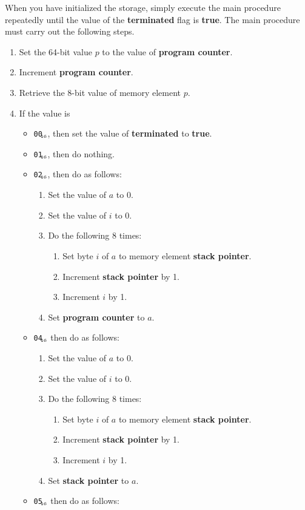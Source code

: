 \documentclass[a4paper,11pt]{article}
\newcommand{\PC}{\textbf{program counter}\xspace}
\newcommand{\SP}{\textbf{stack pointer}\xspace}
\newcommand{\TERM}{\textbf{terminated}\xspace}
\newcommand{\T}{\textbf{true}\xspace}
\newcommand{\num}[1]{\texttt{#1}\xspace}
\newcommand{\hex}[1]{\num{#1}$_{\textup{\tiny\hskip-1ex 16}}$\xspace}
\newcommand{\op}[1]{#1}
\newcommand{\EXIT}     [1]{\op{\hex{00}}\xspace}
\newcommand{\NOP}      [1]{\op{\hex{01}}\xspace}
\newcommand{\JUMP}     [1]{\op{\hex{02}}\xspace}
\newcommand{\SETSP}    [1]{\op{\hex{04}}\xspace}
\newcommand{\GETPC}    [1]{\op{\hex{05}}\xspace}
\begin{document}
When you have initialized the storage, simply execute the main procedure repeatedly until the value of the \TERM flag is \T.
The main procedure must carry out the following steps.
\begin{enumerate}
\item Set the 64-bit value $p$ to the value of \PC.
\item Increment \PC.
\item Retrieve the 8-bit value of memory element $p$.
\item\label{itm:main-case} If the value is
  \begin{itemize}
  \item \EXIT{}, then set the value of  \TERM to \T.
  \item \NOP{}, then do nothing.
  \item \JUMP{}, then do as follows:
    \begin{enumerate}
    \item Set the value of $a$ to 0.
    \item Set the value of $i$ to 0.
    \item Do the following 8 times:
      \begin{enumerate}
      \item Set byte $i$ of $a$ to memory element \SP.
      \item Increment \SP by 1.
      \item Increment $i$ by 1.
      \end{enumerate}
    \item Set \PC to $a$.
    \end{enumerate}
  \item \SETSP, then do as follows:
    \begin{enumerate}
    \item Set the value of $a$ to 0.
    \item Set the value of $i$ to 0.
    \item Do the following 8 times:
      \begin{enumerate}
      \item Set byte $i$ of $a$ to memory element \SP.
      \item Increment \SP by 1.
      \item Increment $i$ by 1.
      \end{enumerate}
    \item Set \SP to $a$.
    \end{enumerate}
  \item \GETPC, then do as follows:
    \begin{enumerate}

\end{enumerate}
\end{itemize}
\end{enumerate}
\end{document}
